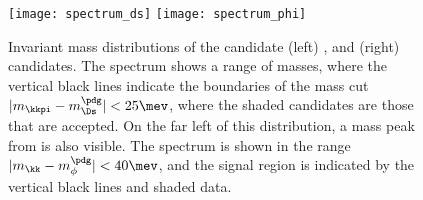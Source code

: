 \begin{figure}
  \begin{center}
    \texttt{[image: spectrum\_ds]}
    \texttt{[image: spectrum\_phi]}
    \caption{\small
      Invariant mass distributions of the candidate
      (left) \decay{\Ds}{\kkpi}, and
      (right) \decay{\phii}{\kk} candidates.
      The \kkpi spectrum shows a range of masses, where the vertical black lines indicate the
      boundaries of the mass cut $|m_{\kkpi}-m_{\Ds}^\pdg|<25\mev$, where the shaded candidates are
      those that are accepted.
      On the far left of this distribution, a mass peak from \decay{\Dp}{\kkpi} is also visible.
      The \decay{\phi}{\kk} spectrum is shown in the range $|m_{\kk}-m_{\phi}^\pdg|<40\mev$,
      and the signal region is indicated by the vertical black lines and shaded data.
    }
    \label{fig:dsphi:mesons}
  \end{center}
\end{figure}

